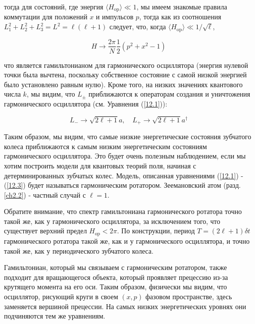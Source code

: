 \documentclass[main.tex]{subfiles}
\begin{document}
тогда для состояний, где энергия $\langle H_{\mathrm{op}} \rangle \ll 1$, мы имеем знакомые правила коммутации для положений $x$ и импульсов $p$, тогда как из соотношения $L_1^2 + L_2^2 + L_3^2 = L^2 = \ell(\ell +1)$ следует, что, когда $\langle H_{\mathrm{op}} \rangle \ll 1/\sqrt{\ell}$,

\begin{equation}\label{12.4}
	H \rightarrow \frac{2 \pi}{N} \frac{1}{2}\left(p^{2}+x^{2}-1\right)
\end{equation}
         
что является гамильтонианом для гармонического осциллятора (энергия нулевой точки была вычтена, поскольку собственное состояние с самой низкой энергией было установлено равным нулю). Кроме того, на низких значениях квантового числа $k$, мы видим, что $L_\pm$ приближаются к операторам создания и уничтожения гармонического осциллятора (см. Уравнения (\ref{12.1})):

\begin{equation}\label{12.5}
	L_{-} \rightarrow \sqrt{2 \ell+1} a, \quad L_{+} \rightarrow \sqrt{2 \ell+1} a^{\dagger}
\end{equation}
                        
Таким образом, мы видим, что самые низкие энергетические состояния зубчатого колеса приближаются к самым низким энергетическим состояниям гармонического осциллятора. Это будет очень полезным наблюдением, если мы хотим построить модели для квантовых теорий поля, начиная с детерминированных зубчатых колес. Модель, описанная уравнениями (\ref{12.1}) - (\ref{12.3}) будет называться гармоническим ротатором. Зеемановский атом (разд. \ref{ch2.2}) - частный случай с $\ell = 1$.

Обратите внимание, что спектр гамильтониана гармонического ротатора точно такой же, как у гармонического осциллятора, за исключением того, что существует верхний предел $H_{\mathrm{op}} < 2\pi$. По конструкции, период $T = (2\ell + 1)\delta t$ гармонического ротатора такой же, как и у гармонического осциллятора, и точно такой же, как у периодического зубчатого колеса.

Гамильтониан, который мы связываем с гармоническим ротатором, также подходит для вращающегося объекта, который проявляет прецессию из-за крутящего момента на его оси. Таким образом, физически мы видим, что осциллятор, рисующий круги в своем $(x, p)$ фазовом пространстве, здесь заменяется вершиной прецессии. На самых низких энергетических уровнях они подчиняются тем же уравнениям.
\end{document}
